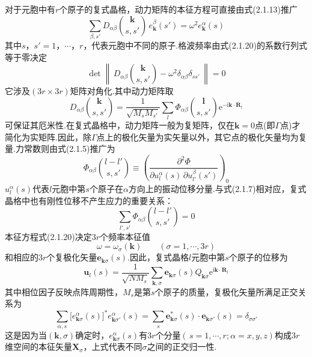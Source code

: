 对于元胞中有$r$个原子的复式晶格，动力矩阵的本征方程可直接由式(2.1.13)推广
\begin{equation}
  \sum_{\beta,s'}D_{\alpha\beta}\binom{\boldsymbol{k}}{s,s'}\,
  e_{\boldsymbol{k}}^{\beta}(s')=\omega^2e_{\boldsymbol{k}}^{\alpha}(s)
\end{equation}
其中$s$，$s'=1$，$\cdots$，$r$，代表元胞中不同的原子.格波频率由式(2.1.20)的系数行列式等于零决定
\begin{equation}
  \det\left\|\,D_{\alpha\beta}\binom{\boldsymbol{k}}{s,s'}
  -\omega^2\delta_{\alpha\beta}\delta_{ss'}\,\right\|=0
\end{equation}
它涉及$(3r\times3r)$矩阵对角化.其中动力矩阵取
\begin{equation}
  D_{\alpha\beta}\binom{\boldsymbol{k}}{s,s'}
  =\frac{1}{\sqrt{M_sM_{s'}}}\sum_{l}\Phi_{\alpha\beta}\binom{\boldsymbol{l}}{s,s'}
  \mathrm{e}^{-\mathrm{i}\boldsymbol{k}\cdot\boldsymbol{R}_l}
\end{equation}
可保证其厄米性.在复式晶格中，动力矩阵一般为复矩阵，仅在$\boldsymbol{k}=0$点(即$\Gamma$点)才简化为实矩阵.因此，除$\Gamma$点上的极化矢量为实矢量以外，其它点的极化矢量均为复量.力常数则由式(2.1.5)推广为
\begin{equation}
  \Phi_{\alpha\beta}\binom{l-l'}{s,s'}\equiv
  \left(\frac{\partial^2\Phi}{\partial u_l^{\alpha}(s)\,
  \partial u_{l'}^{\beta}(s')}\right)_0
\end{equation}
$u_l^{\alpha}(s)$代表$l$元胞中第$s$个原子在$\alpha$方向上的振动位移分量.与式(2.1.7)相对应，复式晶格中也有刚性位移不产生应力的重要关系：
\begin{equation}
  \sum_{l',s'}\Phi_{\alpha\beta}\binom{l-l'}{s,s'}=0
\end{equation}
本征方程式(2.1.20)决定$3r$个频率本征值
\begin{equation}
  \omega=\omega_{\sigma}(\boldsymbol{k})\qquad(\sigma=1,\cdots,3r)
\end{equation}
和相应的$3r$个复极化矢量$\boldsymbol{e}_{\boldsymbol{k}\sigma}(s)$.因此，复式晶格$l$元胞中第$s$个原子的位移为
\begin{equation}
  \boldsymbol{u}_l(s)=\frac{1}{\sqrt{NM_s}}\sum_{\boldsymbol{k},\sigma}
  \boldsymbol{e}_{\boldsymbol{k}\sigma}(s)Q_{\boldsymbol{k}\sigma}
  \mathrm{e}^{\mathrm{i}\boldsymbol{k}\cdot\boldsymbol{R}_l}
\end{equation}
其中相位因子反映点阵周期性，$M_s$是第$s$个原子的质量，复极化矢量所满足正交关系为
\begin{equation}
  \sum_{\alpha,s}\bigl[e_{\boldsymbol{k}\sigma}^{\alpha}(s)\bigr]^{*}
  e_{\boldsymbol{k}\sigma'}^{\alpha}(s)
  =\sum_{s}\boldsymbol{e}_{\boldsymbol{k}\sigma}^{*}(s)\cdot
  \boldsymbol{e}_{\boldsymbol{k}\sigma'}(s)=\delta_{\sigma\sigma'}
\end{equation}
这是因为当$(\boldsymbol{k},\sigma)$确定时，$e_{\boldsymbol{k}\sigma}^{\alpha}(s)$有$3r$个分量$(\,s=1,\cdots,r;\alpha=x,y,z)$构成$3r$维空间的本征矢量$\boldsymbol{X}_{\sigma}$，上式代表不同$\sigma$之间的正交归一性.

